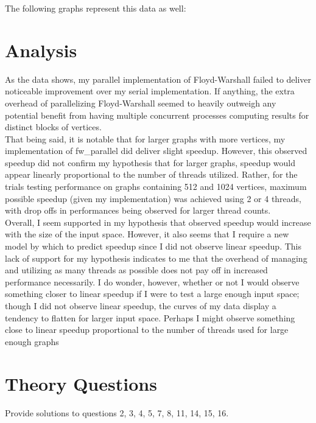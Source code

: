 \documentclass[]{article}
\begin{document}
	The following graphs represent this data as well:
	\\
	

\section{Analysis}
	As the data shows, my parallel implementation of Floyd-Warshall failed to deliver noticeable improvement over my serial implementation. If anything, the extra overhead of parallelizing Floyd-Warshall seemed to heavily outweigh any potential benefit from having multiple concurrent processes computing results for distinct blocks of vertices.
	\\
	That being said, it is notable that for larger graphs with more vertices, my implementation of fw\_parallel did deliver slight speedup. However, this observed speedup did not confirm my hypothesis that for larger graphs, speedup would appear linearly proportional to the number of threads utilized. Rather, for the trials testing performance on graphs containing 512 and 1024 vertices, maximum possible speedup (given my implementation) was achieved using 2 or 4 threads, with drop offs in performances being observed for larger thread counts.
	\\
	Overall, I seem supported in my hypothesis that observed speedup would increase with the size of the input space. However, it also seems that I require a new model by which to predict speedup since I did not observe linear speedup. This lack of support for my hypothesis indicates to me that the overhead of managing and utilizing as many threads as possible does not pay off in increased performance necessarily. I do wonder, however, whether or not I would observe something closer to linear speedup if I were to test a large enough input space; though I did not observe linear speedup, the curves of my data display a tendency to flatten for larger input space. Perhaps I might observe something close to linear speedup proportional to the number of threads used for large enough graphs
	\\

\section{Theory Questions}
Provide solutions to questions 2, 3, 4, 5, 7, 8, 11, 14, 15, 16.
\end{document}
